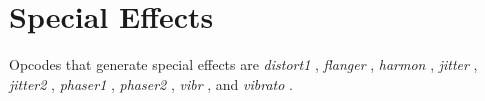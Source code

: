\begin{comment}
\documentclass[10pt]{article}
\usepackage{fullpage, graphicx, url}
\setlength{\parskip}{1ex}
\setlength{\parindent}{0ex}
\title{Special Effects}



\begin{tabular}{ccc}
The Alternative Csound Reference Manual & & \\
Previous &Signal Modifiers &Next

\end{tabular}

\end{comment}
\section{Special Effects}


  Opcodes that generate special effects are \emph{distort1}
, \emph{flanger}
, \emph{harmon}
, \emph{jitter}
, \emph{jitter2}
, \emph{phaser1}
, \emph{phaser2}
, \emph{vibr}
, and \emph{vibrato}
. 


\begin{comment}
\begin{tabular}{lcr}
Previous &Home &Next \\
Signal Limiters &Up &Specialized Filters

\end{tabular}



\end{comment}
